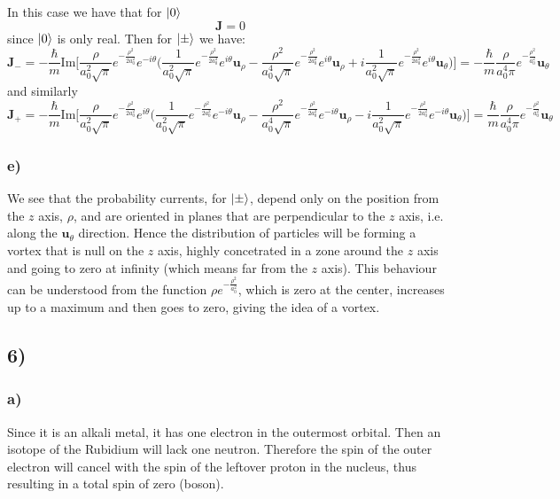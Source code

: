 \documentclass[10pt,a4paper]{book}
\begin{document}
In this case we have that for $\ket{0}$
$$\mathbf{J}=0$$ since $\ket{0}$ is only real. Then for $\ket{\pm}$ we have:
$$\mathbf{J}_-=-\frac{\hbar}{m}\text{Im}\bigg[\frac{\rho}{a_0^2\sqrt{\pi}}e^{-\frac{\rho^2}{2a_0^2}}e^{-i\theta}\bigg(\frac{1}{a_0^2\sqrt{\pi}}e^{-\frac{\rho^2}{2a_0^2}}e^{i\theta}\mathbf{u}_{\rho}-\frac{\rho^2}{a_0^4\sqrt{\pi}}e^{-\frac{\rho^2}{2a_0^2}}e^{i\theta}\mathbf{u}_{\rho}+i\frac{1}{a_0^2\sqrt{\pi}}e^{-\frac{\rho^2}{2a_0^2}}e^{i\theta}\mathbf{u}_{\theta}\bigg)\bigg]=-\frac{\hbar}{m}\frac{\rho}{a_0^4\pi}e^{-\frac{\rho^2}{a_0^2}}\mathbf{u}_{\theta}$$
and similarly
$$\mathbf{J}_+=-\frac{\hbar}{m}\text{Im}\bigg[\frac{\rho}{a_0^2\sqrt{\pi}}e^{-\frac{\rho^2}{2a_0^2}}e^{i\theta}\bigg(\frac{1}{a_0^2\sqrt{\pi}}e^{-\frac{\rho^2}{2a_0^2}}e^{-i\theta}\mathbf{u}_{\rho}-\frac{\rho^2}{a_0^4\sqrt{\pi}}e^{-\frac{\rho^2}{2a_0^2}}e^{-i\theta}\mathbf{u}_{\rho}-i\frac{1}{a_0^2\sqrt{\pi}}e^{-\frac{\rho^2}{2a_0^2}}e^{-i\theta}\mathbf{u}_{\theta}\bigg)\bigg]=\frac{\hbar}{m}\frac{\rho}{a_0^4\pi}e^{-\frac{\rho^2}{a_0^2}}\mathbf{u}_{\theta}$$


\subsubsection*{e)}

We see that the probability currents, for $\ket{\pm}$, depend only on the position from the $z$ axis, $\rho$, and are oriented in planes that are perpendicular to the $z$ axis, i.e. along the $\mathbf{u}_{\theta}$ direction. Hence the distribution of particles will be forming a vortex that is null on the $z$ axis, highly concetrated in a zone around the $z$ axis and going to zero at infinity (which means far from the $z$ axis). This behaviour can be understood from the function $\rho e^{-\frac{\rho^2}{a_0^2}}$, which is zero at the center, increases up to a maximum and then goes to zero, giving the idea of a vortex.

\subsection*{6)}

\subsubsection*{a)}

Since it is an alkali metal, it has one electron in the outermost orbital. Then an isotope of the Rubidium will lack one neutron. Therefore the spin of the outer electron will cancel with the spin of the leftover proton in the nucleus, thus resulting in a total spin of zero (boson).
\end{document}
